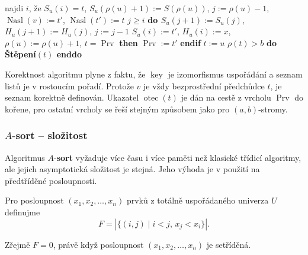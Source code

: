 \documentclass[a4paper,12pt]{article}
\DeclareMathOperator*{\otec}{otec}
\DeclareMathOperator*{\Prv}{Prv}
\DeclareMathOperator*{\Nasl}{Nasl}
\DeclareMathOperator*{\key}{key}
\begin{document}
{\newline 
\phantom{---------}najdi $i$, že $S_u(i)=t$, $S_u(\rho(u)+1):=S(\rho(u))$,\newline 
\phantom{---------}$j:=\rho (u)-1$, $\Nasl(v):=t'$, $\Nasl(t'):=t$\newline 
{} $j\ge i$ {\bf \textsf{do}\newline 
\phantom{------------}$S_u(j+1):=S_u(j)$}, $H_u(j+1):=H_u(j)$, $j:=j-1$\newline 
{}\newline 
\phantom{---------}$S_u(i):=t'$, $H_u(i):=x$, $\rho (u):=\rho (u)+1$,\newline 
{} $t=\Prv$ {\bf \textsf{then}} $\Prv:=t'$ {\bf \textsf{endif}}\newline 
{}\newline 
\phantom{------}$t:=u$\newline 
{} $\rho (t)>b$ {\bf \textsf{do} Štěpení$(t)$ \textsf{enddo}}\newline 
{}}

Korektnost algoritmu plyne z faktu, že $\key$ je 
izomorfismus uspo\-řá\-dání a seznam listů je v 
rostoucím pořadí. Protože $v$ je vždy bez\-prost\-řední 
předchůdce $t$, je seznam korektně definován. 
U\-ka\-zatel $\otec(t)$ je dán na cestě z vrcholu $\Prv$ do 
kořene, pro ostatní vrcholy se řeší stejným 
způsobem jako pro $(a,b)$-stromy.

\subsubsection{$A$-{\bf sort} -- složitost}

Algoritmus $A$-{\bf sort} vyžaduje více 
času i více paměti než klasické třídicí algoritmy, ale jejich 
asymptotická složitost je stejná. Jeho výhoda je v použití 
na před\-tří\-děné posloupnosti.


\begin{definice}
    Pro posloupnost $
    (x_1,x_2,\dots,x_n)$ 
    prvků z to\-tálně uspořádaného univerza $U$ definujme $$F=|\{(i,j)\mid i<j,\,x_j<x_i\}|.$$
\end{definice}


Zřejmě $F=0$, právě když posloupnost 
$(x_1,x_2,\dots,x_n)$ je setří\-děná. 
\end{document}
